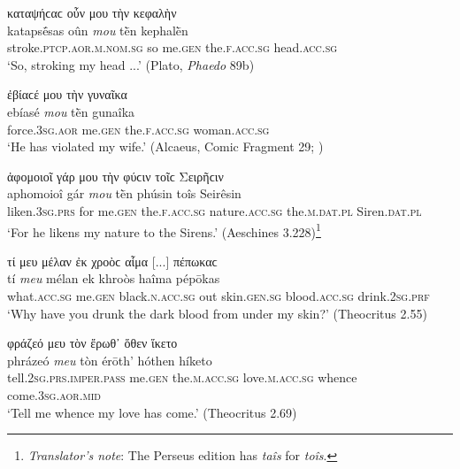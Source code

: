 \begin{exe}
\ex καταψήϲαϲ οὖν μου τὴν κεφαλὴν\\
\gll katapsḗsas oûn \emph{mou} tḕn kephalḕn\\
stroke.\textsc{ptcp.aor.m.nom.sg} so me.\textsc{gen} the.\textsc{f.acc.sg} head.\textsc{acc.sg}\\
\trans `So, stroking my head ...' (Plato, \textit{Phaedo} 89b)
\label{gen16}
\end{exe}

\begin{exe}
\ex ἐβίαϲέ μου τὴν γυναῖκα\\
\gll ebíasé \emph{mou} tḕn gunaîka\\
force.\textsc{3sg.aor} me.\textsc{gen} the.\textsc{f.acc.sg} woman.\textsc{acc.sg}\\
\trans `He has violated my wife.' (Alcaeus, Comic Fragment 29; \citealp{Kock1880})
\label{gen17}
\end{exe}

\begin{exe}
\ex ἀφομοιοῖ γάρ μου τὴν φύϲιν τοῖϲ Σειρῆϲιν\\
\gll aphomoioî gár \emph{mou} tḕn phúsin toîs Seirêsin\\
liken.\textsc{3sg.prs} for me.\textsc{gen} the.\textsc{f.acc.sg}
nature.\textsc{acc.sg} the.\textsc{m.dat.pl} Siren.\textsc{dat.pl}\\
\trans `For he likens my nature to the Sirens.' (Aeschines 3.228)\footnote{\emph{Translator's note}: The Perseus edition has \textit{taîs} for \textit{toîs}.}
\label{gen18}
\end{exe}

\begin{exe}
\ex τί μευ μέλαν ἐκ χροὸϲ αἷμα {[}...{]} πέπωκαϲ\\
\gll tí \emph{meu} mélan ek khroòs haîma pépōkas\\
what.\textsc{acc.sg} me.\textsc{gen} black.\textsc{n.acc.sg} out skin.\textsc{gen.sg} blood.\textsc{acc.sg} drink.\textsc{2sg.prf}\\
\trans `Why have you drunk the dark blood from under my skin?' (Theocritus 2.55)
\label{gen19}
\end{exe}

\begin{exe}
\ex φράζεό μευ τὸν ἔρωθ᾽ ὅθεν ἵκετο\\
\gll phrázeó \emph{meu} tòn érōth' hóthen híketo\\
tell.\textsc{2sg.prs.imper.pass} me.\textsc{gen} the.\textsc{m.acc.sg} love.\textsc{m.acc.sg} whence come.\textsc{3sg.aor.mid}\\
\trans `Tell me whence my love has come.' (Theocritus 2.69)
\label{gen20}
\end{exe}

